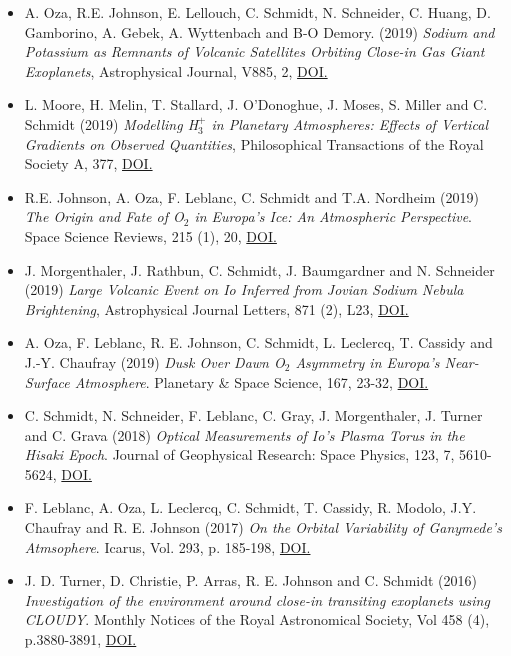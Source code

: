 \documentclass[12pt]{report}
\begin{document}
\begin{itemize}
  \item A. Oza, R.E. Johnson, E. Lellouch, C. Schmidt, N. Schneider, C. Huang, D. Gamborino, A. Gebek, A. Wyttenbach and B-O Demory. (2019) \textit{Sodium and Potassium as Remnants of Volcanic Satellites Orbiting Close-in Gas Giant Exoplanets}, Astrophysical Journal, V885, 2, \href{https://doi.org/10.3847/1538-4357/ab40cc}{DOI.}
  \item L. Moore, H. Melin, T. Stallard, J. O'Donoghue, J. Moses, S. Miller and C. Schmidt (2019) \textit{Modelling H$_3^+$ in Planetary Atmospheres: Effects of Vertical Gradients on Observed Quantities}, Philosophical Transactions of the Royal Society A, 377, \href{https://doi.org/10.1098/rsta.2019.0067}{DOI.}
  \item R.E. Johnson, A. Oza, F. Leblanc,  C. Schmidt and T.A. Nordheim (2019) \textit{The Origin and Fate of O$_2$ in Europa's Ice: An Atmospheric Perspective}. Space Science Reviews, 215 (1), 20, \href{https://doi.org/10.1007/s11214-019-0582-1}{DOI.}
  \item J. Morgenthaler, J. Rathbun, C. Schmidt, J. Baumgardner and N. Schneider (2019) \textit{Large Volcanic Event on Io Inferred from Jovian Sodium Nebula Brightening}, Astrophysical Journal Letters, 871 (2), L23, \href{https://doi.org/10.3847/2041-8213/aafdb7}{DOI.}
  \item A. Oza, F. Leblanc, R. E. Johnson, C. Schmidt, L. Leclercq, T. Cassidy and J.-Y. Chaufray (2019) \textit{Dusk Over Dawn O$_2$ Asymmetry in Europa's Near-Surface Atmosphere}. Planetary \& Space Science, 167, 23-32, \href{https://doi.org/10.1016/j.pss.2019.01.006}{DOI.}
  \item C. Schmidt, N. Schneider, F. Leblanc, C. Gray, J. Morgenthaler, J. Turner and C. Grava (2018) \textit{Optical Measurements of Io's Plasma Torus in the Hisaki Epoch}. Journal of Geophysical Research: Space Physics, 123, 7, 5610-5624, \href{https://doi.org/10.1029/2018JA025296}{DOI.}
  \item F. Leblanc, A. Oza, L. Leclercq, C. Schmidt, T. Cassidy, R. Modolo, J.Y. Chaufray and R. E. Johnson (2017) \textit{On the Orbital Variability of Ganymede's Atmsophere}. Icarus, Vol. 293, p. 185-198, \href{doi.org/10.1016/j.icarus.2017.04.025}{DOI.}
  \item J. D. Turner, D. Christie, P. Arras, R. E. Johnson and C. Schmidt (2016) \textit{Investigation of the environment around close-in transiting exoplanets using CLOUDY}. Monthly Notices of the Royal Astronomical Society, Vol 458 (4), p.3880-3891, \href{https://doi.org/10.1093/mnras/stw556}{DOI.}

\end{itemize}
\end{document}
